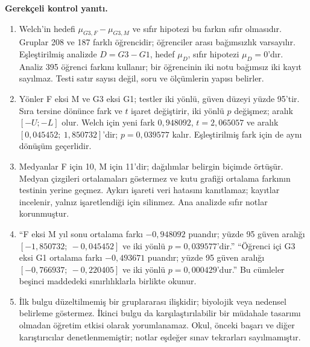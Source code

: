 \textbf{Gerekçeli kontrol yanıtı.}
\begin{enumerate}
  \item Welch'in hedefi $\mu_{G3,F}-\mu_{G3,M}$ ve sıfır hipotezi
  bu farkın sıfır olmasıdır. Gruplar 208 ve 187 farklı öğrencidir;
  öğrenciler arası bağımsızlık varsayılır. Eşleştirilmiş analizde
  $D=G3-G1$, hedef $\mu_D$, sıfır hipotezi $\mu_D=0$'dır.
  Analiz 395 öğrenci farkını kullanır; bir öğrencinin iki notu
  bağımsız iki kayıt sayılmaz. Testi satır sayısı değil, soru ve
  ölçümlerin yapısı belirler.
  \item Yönler F eksi M ve G3 eksi G1; testler iki yönlü, güven
  düzeyi yüzde 95'tir. Sıra tersine dönünce fark ve $t$ işaret
  değiştirir, iki yönlü $p$ değişmez; aralık $[-U;-L]$ olur.
  Welch için yeni fark $0{,}948092$, $t=2{,}065057$ ve aralık
  $[0{,}045452;\ 1{,}850732]$'dir; $p=0{,}039577$ kalır.
  Eşleştirilmiş fark için de aynı dönüşüm geçerlidir.
  \item Medyanlar F için 10, M için 11'dir; dağılımlar belirgin
  biçimde örtüşür. Medyan çizgileri ortalamaları göstermez ve kutu
  grafiği ortalama farkının testinin yerine geçmez. Aykırı işareti
  veri hatasını kanıtlamaz; kayıtlar incelenir, yalnız işaretlendiği
  için silinmez. Ana analizde sıfır notlar korunmuştur.
  \item ``F eksi M yıl sonu ortalama farkı $-0{,}948092$ puandır;
  yüzde 95 güven aralığı $[-1{,}850732;\ -0{,}045452]$ ve
  iki yönlü $p=0{,}039577$'dir.''
  ``Öğrenci içi G3 eksi G1 ortalama farkı $-0{,}493671$ puandır;
  yüzde 95 güven aralığı $[-0{,}766937;\ -0{,}220405]$ ve
  iki yönlü $p=0{,}000429$'dur.''
  Bu cümleler beşinci maddedeki sınırlılıklarla birlikte okunur.
  \item İlk bulgu düzeltilmemiş bir gruplararası ilişkidir;
  biyolojik veya nedensel belirleme göstermez. İkinci bulgu da
  karşılaştırılabilir bir müdahale tasarımı olmadan öğretim etkisi
  olarak yorumlanamaz. Okul, önceki başarı ve diğer karıştırıcılar
  denetlenmemiştir; notlar eşdeğer sınav tekrarları sayılmamıştır.
\end{enumerate}

